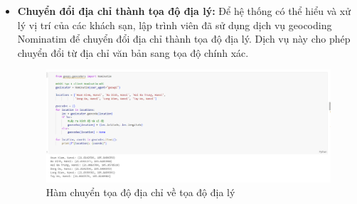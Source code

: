 \begin{itemize}
    \item \textbf{Chuyển đổi địa chỉ thành tọa độ địa lý:} Để hệ thống có thể hiểu và xử lý vị trí của các khách sạn, lập trình viên đã sử dụng dịch vụ geocoding Nominatim để chuyển đổi địa chỉ thành tọa độ địa lý. Dịch vụ này cho phép chuyển đổi từ địa chỉ văn bản sang tọa độ chính xác. 
    \begin{figure}[H] %
        \centering
        \includegraphics[width=1.0\linewidth]{Figures/2.10.png}
        \caption{Hàm chuyển tọa độ địa chỉ về tọa độ địa lý}
        \label{fig:iot}
    \end{figure}
    

\end{itemize}
